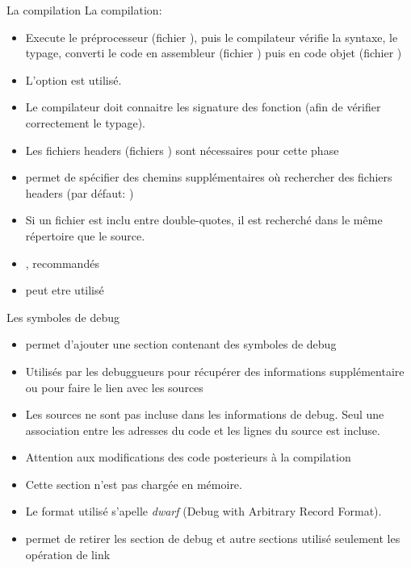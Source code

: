 \begin{frame}[fragile=singleslide]{La compilation}
  La compilation:
  \begin{itemize}
  \item  Execute   le  préprocesseur  (fichier   ),  puis  le
    compilateur  vérifie la syntaxe,  le typage,  converti le  code en
    assembleur  (fichier  )   puis  en  code  objet  (fichier
    )
  \item L'option  est utilisé.
  \item Le compilateur doit connaitre les signature des fonction (afin
    de vérifier correctement le typage).
  \item  Les fichiers  headers (fichiers  )  sont nécessaires
    pour cette phase
  \item {}  permet de spécifier des  chemins supplémentaires où
    rechercher des fichiers headers (par défaut: )
  \item Si un fichier est  inclu entre double-quotes, il est recherché
    dans le même répertoire que le source.
  \item {},  recommandés
  \item {} peut etre utilisé
  \end{itemize}
\end{frame}

\begin{frame}[fragile=singleslide]{Les symboles de debug}
  \begin{itemize}
  \item {}  permet d'ajouter une section  contenant des symboles
    de debug
  \item Utilisés  par les debuggueurs pour  récupérer des informations
    supplémentaire ou pour faire le lien avec les sources
  \item  Les sources  ne sont  pas  incluse dans  les informations  de
    debug.  Seul une  association entre  les adresses  du code  et les
    lignes du source est incluse.
  \item  Attention  aux  modifications   des  code  posterieurs  à  la
    compilation
  \item Cette section n'est pas chargée en mémoire.
  \item Le format utilisé s'apelle \emph{dwarf} (Debug with Arbitrary
    Record Format).
  \item {}  permet de retirer  les section de debug  et autre
    sections utilisé seulement les opération de link
  \end{itemize}
\end{frame}


